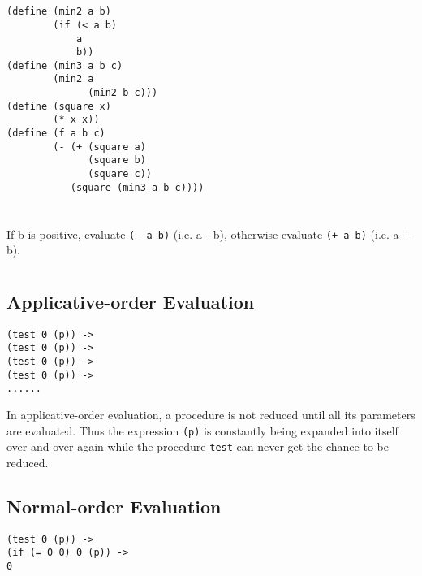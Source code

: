 \documentclass[a4paper]{report}
\begin{document}

\section{}

\begin{lstlisting}
(define (min2 a b)
        (if (< a b)
            a
            b))
(define (min3 a b c)
        (min2 a
              (min2 b c)))
(define (square x)
        (* x x))
(define (f a b c)
        (- (+ (square a)
              (square b)
              (square c))
           (square (min3 a b c))))
\end{lstlisting}


\section{}

If b is positive, evaluate \lstinline{(- a b)} (i.e. a - b), otherwise evaluate \lstinline{(+ a b)} (i.e. a + b).


\section{}

\subsection*{Applicative-order Evaluation}

\begin{lstlisting}
(test 0 (p)) ->
(test 0 (p)) ->
(test 0 (p)) ->
(test 0 (p)) ->
......
\end{lstlisting}

In applicative-order evaluation, a procedure is not reduced until all its parameters are evaluated. Thus the expression \lstinline{(p)} is constantly being expanded into itself over and over again while the procedure \lstinline{test} can never get the chance to be reduced.

\subsection*{Normal-order Evaluation}

\begin{lstlisting}
(test 0 (p)) ->
(if (= 0 0) 0 (p)) ->
0
\end{lstlisting}
\end{document}
